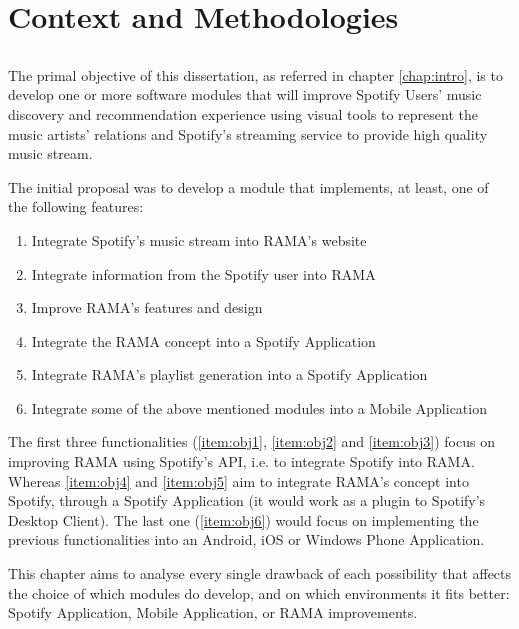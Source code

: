 
\chapter{Context and Methodologies}
\label{chap:chap3}

\section*{}

The primal objective of this dissertation, as referred in chapter \ref{chap:intro}, is to develop one or more software modules that will improve Spotify Users' music discovery and recommendation experience using visual tools to represent the music artists' relations and Spotify's streaming service to provide high quality music stream.

The initial proposal was to develop a module that implements, at least, one of the following features:

\begin{enumerate}
  \item \label{item:obj1} Integrate Spotify's music stream into RAMA's website
  \item \label{item:obj2} Integrate information from the Spotify user into RAMA
  \item \label{item:obj3} Improve RAMA's features and design
  \item \label{item:obj4} Integrate the RAMA concept into a Spotify Application
  \item \label{item:obj5} Integrate RAMA's playlist generation into a Spotify Application
  \item \label{item:obj6} Integrate some of the above mentioned modules into a Mobile Application
\end{enumerate}

The first three functionalities (\ref{item:obj1}, \ref{item:obj2} and \ref{item:obj3}) focus on improving RAMA using Spotify's API, i.e. to integrate Spotify into RAMA.
Whereas \ref{item:obj4} and \ref{item:obj5} aim to integrate RAMA's concept into Spotify, through a Spotify Application (it would work as a plugin to Spotify's Desktop Client).
The last one (\ref{item:obj6}) would focus on implementing the previous functionalities into an Android, iOS or Windows Phone Application.

This chapter aims to analyse every single drawback of each possibility that affects the choice of which modules do develop, and on which environments it fits better: Spotify Application, Mobile Application, or RAMA improvements.

